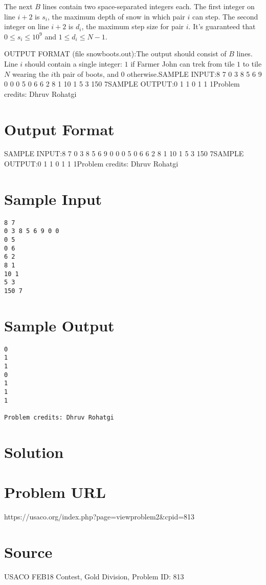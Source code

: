 \documentclass[12pt]{article}
\begin{document}
The next $B$ lines contain two space-separated integers each. The first integer
on line $i+2$ is $s_i$, the maximum depth of snow in which pair $i$ can step.
The second integer on line $i+2$ is $d_i$, the maximum step size for pair $i$.
It's guaranteed that $0 \leq s_i \leq 10^9$ and $1 \leq d_i \leq N-1$.

OUTPUT FORMAT (file snowboots.out):The output should consist of $B$ lines. Line $i$ should contain a single
integer: $1$ if Farmer John can trek from tile $1$ to
tile $N$ wearing the $i$th pair of boots, and $0$ otherwise.SAMPLE INPUT:8 7
0 3 8 5 6 9 0 0
0 5
0 6
6 2
8 1
10 1
5 3
150 7SAMPLE OUTPUT:0
1
1
0
1
1
1Problem credits: Dhruv Rohatgi

\section*{Output Format}
SAMPLE INPUT:8 7
0 3 8 5 6 9 0 0
0 5
0 6
6 2
8 1
10 1
5 3
150 7SAMPLE OUTPUT:0
1
1
0
1
1
1Problem credits: Dhruv Rohatgi

\section*{Sample Input}
\begin{verbatim}
8 7
0 3 8 5 6 9 0 0
0 5
0 6
6 2
8 1
10 1
5 3
150 7
\end{verbatim}

\section*{Sample Output}
\begin{verbatim}
0
1
1
0
1
1
1

Problem credits: Dhruv Rohatgi
\end{verbatim}

\section*{Solution}


\section*{Problem URL}
https://usaco.org/index.php?page=viewproblem2&cpid=813

\section*{Source}
USACO FEB18 Contest, Gold Division, Problem ID: 813
\end{document}
